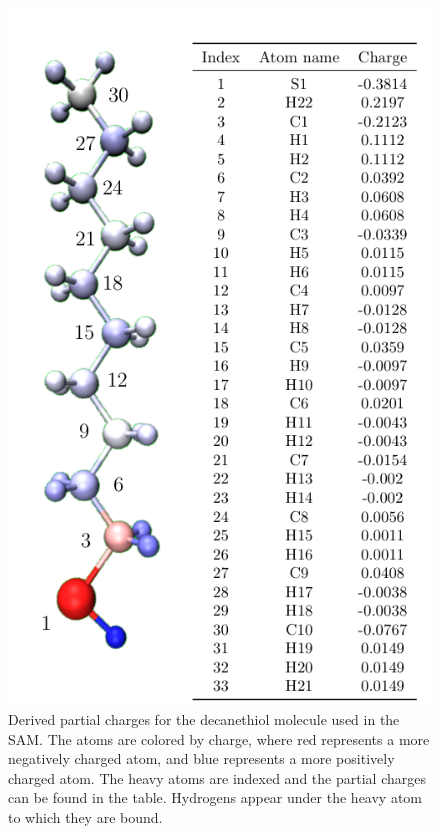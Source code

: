 \begin{figure}
    \center
    \includegraphics[width=\single]{figures-helix/charge_figure.png}
    \caption[Derived partial charges of decanethiol]{
        Derived partial charges for the decanethiol molecule used in the SAM. 
        The atoms are colored by charge, where red represents a more negatively charged atom, and blue represents a more positively charged atom. 
        The heavy atoms are indexed and the partial charges can be found in the table. 
        Hydrogens appear under the heavy atom to which they are bound.
    }
    \label{fig:helix-charges}
\end{figure}

